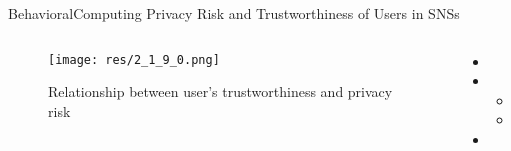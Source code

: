\begin{frame}{Behavioral}{Computing Privacy Risk and Trustworthiness of Users in {SNSs} \cite{pandey_computing_2015}}

	\begin{columns}
		\begin{column}{0.7\textwidth}
			\begin{center}
			
				\begin{figure}
					\texttt{[image: res/2\_1\_9\_0.png]}
					\caption{\label{fig:2_1_9_0} Relationship between user’s trustworthiness and privacy risk}
				\end{figure}
				
			\end{center}
		\end{column}
		
		\begin{column}{0.3\textwidth}
		
			\begin{itemize}
				\item 
				
				\item 
					\begin{itemize}
						\item 
						\item 
					\end{itemize}
				
				\item 
			\end{itemize}
			
		\end{column}
	\end{columns}
	

\end{frame}

